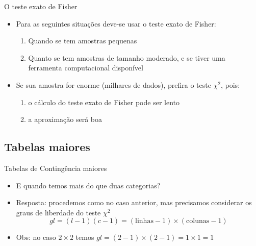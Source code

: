 \documentclass{beamer}
\begin{document}
\begin{frame}{O teste exato de Fisher}
  \begin{itemize}
  \item Para as seguintes situações deve-se usar o teste exato de
    Fisher:
    \begin{enumerate}
    \item Quando se tem amostras pequenas
    \item Quanto se tem amostras de tamanho moderado, e se tiver uma
      ferramenta computacional disponível
    \end{enumerate}
  \item Se sua amostra for enorme (milhares de dados), prefira o teste
    $\chi^2$, pois:
    \begin{enumerate}
    \item o cálculo do teste exato de Fisher pode ser lento
    \item a aproximação será boa
    \end{enumerate}
  \end{itemize}
\end{frame}

\subsection{Tabelas maiores}

\begin{frame}{Tabelas de Contingência maiores}
  \small
  \begin{itemize}
  \item E quando temos mais do que duas categorias?
    \bigskip
  \item Resposta: procedemos como no caso anterior, mas precisamos
    considerar os \alert{graus de liberdade} do teste $\chi^2$
    \begin{displaymath}
        gl = (l-1)(c-1) = (\text{linhas} -1)\times (\text{colunas}-1)
    \end{displaymath}
    \bigskip
  \item Obs: no caso $2 \times 2$ temos $gl = (2-1) \times (2-1)=1
    \times 1 = 1$
  \end{itemize}
\end{frame}

\end{document}
